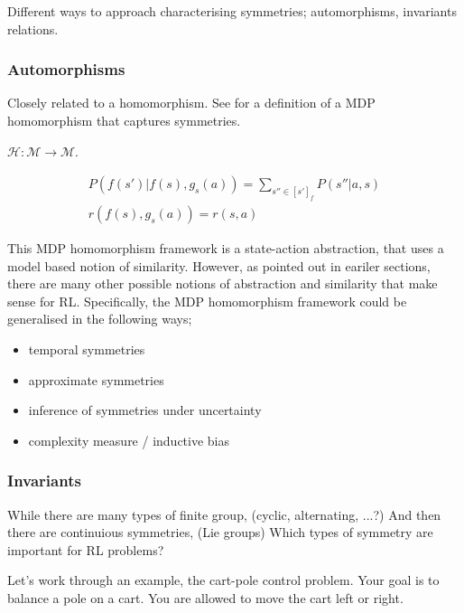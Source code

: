Different ways to approach characterising symmetries; automorphisms, invariants relations.

\subsubsection{Automorphisms}

Closely related to a homomorphism. See for a definition of a MDP homomorphism that captures symmetries.

\cite{Ravindran2002}

$\mathcal H: \mathcal M\to \mathcal M$.

\begin{align}
P(f(s')|f(s), g_s(a)) = \sum_{s''\in [s']_f} P(s''| a, s) \\
r(f(s), g_s(a)) = r(s, a)
\end{align}

This MDP homomorphism framework is a state-action abstraction, that uses a model based notion of similarity.
However, as pointed out in eariler sections, there are many other possible
notions of abstraction and similarity that make sense for RL. Specifically, the MDP homomorphism framework
could be generalised in the following ways;

\begin{itemize}
\tightlist
  \item temporal symmetries
  \item approximate symmetries
  \item inference of symmetries under uncertainty
  \item complexity measure / inductive bias
\end{itemize}

\subsubsection{Invariants}

While there are many types of finite group, (cyclic, alternating, ...?) And then there are continuious symmetries, (Lie groups)
Which types of symmetry are important for RL problems?

Let's work through an example, the cart-pole control problem. Your goal is to balance a pole on a cart.
You are allowed to move the cart left or right.

